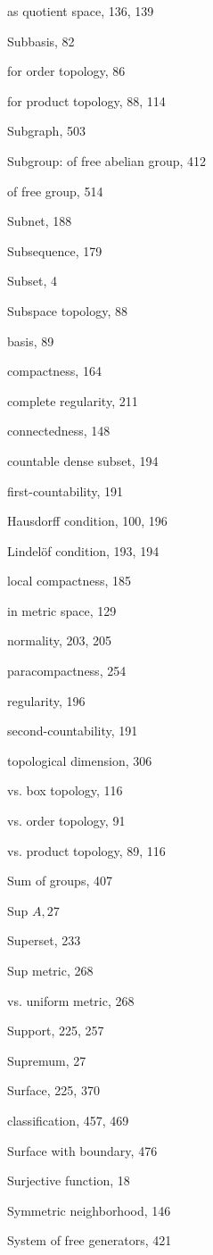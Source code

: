 as quotient space, 136, 139

Subbasis, 82

for order topology, 86

for product topology, 88, 114

Subgraph, 503

Subgroup: of free abelian group, 412

of free group, 514

Subnet, 188

Subsequence, 179

Subset, 4

Subspace topology, 88

basis, 89

compactness, 164

complete regularity, 211

connectedness, 148

countable dense subset, 194

first-countability, 191

Hausdorff condition, 100, 196

Lindelöf condition, 193, 194

local compactness, 185

in metric space, 129

normality, 203, 205

paracompactness, 254

regularity, 196

second-countability, 191

topological dimension, 306

vs. box topology, 116

vs. order topology, 91

vs. product topology, 89, 116

Sum of groups, 407

Sup \(A,{27}\)

Superset, 233

Sup metric, 268

vs. uniform metric, 268

Support, 225, 257

Supremum, 27

Surface, 225, 370

classification, 457, 469

Surface with boundary, 476

Surjective function, 18

Symmetric neighborhood, 146

System of free generators, 421

